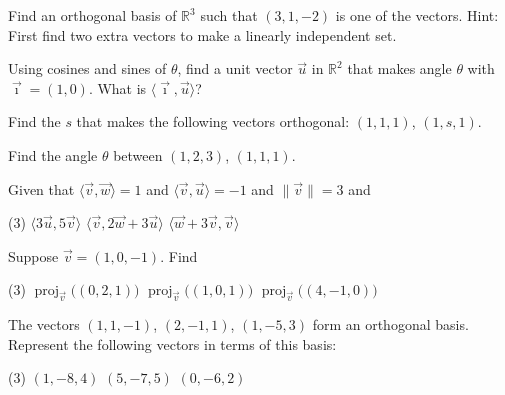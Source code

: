 \begin{exercise}
Find an orthogonal basis of ${\mathbb{R}}^3$ such that $(3,1,-2)$
is one of the vectors.  Hint: First find two extra vectors to make a
linearly independent set.
\end{exercise}

\begin{exercise}
Using cosines and sines of $\theta$, find a unit vector $\vec{u}$
in ${\mathbb{R}}^2$ that
makes angle $\theta$ with $\vec{\imath} = (1,0)$.  What is
$\langle \vec{\imath} , \vec{u} \rangle$?
\end{exercise}

\setcounter{exercise}{100}

\begin{exercise}
Find the $s$ that makes the following vectors orthogonal:
$(1,1,1)$, $(1,s,1)$.
\end{exercise}

\begin{exercise}
Find the angle $\theta$ between
$(1,2,3)$, $(1,1,1)$.
\end{exercise}

\begin{exercise}
Given that $\langle \vec{v} , \vec{w} \rangle = 1$ and
$\langle \vec{v} , \vec{u} \rangle = -1$  and
$\lVert \vec{v} \rVert = 3$  and
\begin{tasks}(3)
\task $\langle 3 \vec{u} , 5 \vec{v} \rangle$
\task $\langle \vec{v} , 2 \vec{w} + 3 \vec{u} \rangle$
\task $\langle \vec{w} + 3 \vec{v}, \vec{v} \rangle$
\end{tasks}
\end{exercise}

\begin{exercise}
Suppose $\vec{v} = (1,0,-1)$.  Find
\begin{tasks}(3)
\task $\operatorname{proj}_{\vec{v}}\bigl( (0,2,1) \bigr)$
\task $\operatorname{proj}_{\vec{v}}\bigl( (1,0,1) \bigr)$
\task $\operatorname{proj}_{\vec{v}}\bigl( (4,-1,0) \bigr)$
\end{tasks}
\end{exercise}

\begin{exercise}
The vectors $(1,1,-1)$, $(2,-1,1)$, $(1,-5,3)$ form an orthogonal basis.
Represent the following vectors in terms of this basis:
\begin{tasks}(3)
\task $(1,-8,4)$
\task $(5,-7,5)$
\task $(0,-6,2)$
\end{tasks}
\end{exercise}

